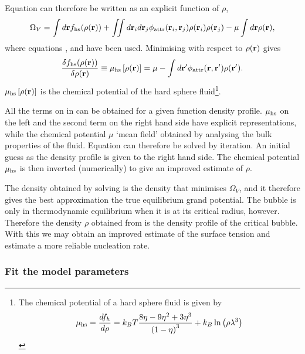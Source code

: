 Equation  can therefore be written as an explicit function of $\rho$,
\begin{align}
   \Omega_V = \int d\textbf{r} f_{\text{hs}}(\rho(\textbf{r}))  +   \iint d \textbf{r}_i d\textbf{r}_j \phi_{\text{attr}}( \textbf{r}_i, \textbf{r}_j) \rho(\textbf{r}_i)\rho(\textbf{r}_j) -  \mu \int d\textbf{r} \rho(\textbf{r}),  \label{eqn:OmegaV}
\end{align}
where equations ,  and  have been used.
Minimising  with respect to $\rho(\textbf{r})$ gives
\begin{align}
  \frac{\delta  f_{\text{hs}}(\rho(\textbf{r})) }{\delta \rho(\textbf{r})} \equiv \mu_{\text{hs}}\left[ \rho(\textbf{r}) \right] = \mu - \int d\textbf{r}^\prime \phi_{\text{attr}}( \textbf{r}, \textbf{r}^\prime) \rho(\textbf{r}^\prime). \label{eqn:ChemPots}
\end{align}
$\mu_{\text{hs}}\left[ \rho(\textbf{r}) \right]$ is the chemical potential of the hard sphere fluid\footnote{
The chemical potential of a hard sphere fluid is given by 
\begin{align}
 \mu_{\text{hs}} = \frac{d f_h}{d \rho} =  k_B T\frac{8\eta - 9 \eta^2 + 3\eta^3}{\left( 1-\eta \right)^3} + k_B \ln \left( \rho \lambda^3 \right)
\end{align}
}.

All the terms on in  can be obtained for a given function density profile.
$\mu_{\text{hs}}$ on the left and the second term on the right hand side have explicit representations, while
the chemical potential $\mu$ `mean field' obtained by analysing the bulk properties of the fluid.
Equation  can therefore be solved by iteration.
An initial guess as the density profile is given to the right hand side.
The chemical potential $\mu_{\text{hs}}$ is then inverted (numerically) to give an improved estimate of $\rho$.

The density obtained by solving  is the density that minimises $\Omega_V$,
and it therefore gives the best approximation the true equilibrium grand potential.
The bubble is only in thermodynamic equilibrium when it is at its critical radius, however.
Therefore the density $\rho$ obtained from  is the density profile of the critical bubble.
With this we may obtain an improved estimate of the surface tension and estimate a more reliable nucleation rate.

\subsubsection{Fit the model parameters}\label{sec:nuc:DFT:fit}

